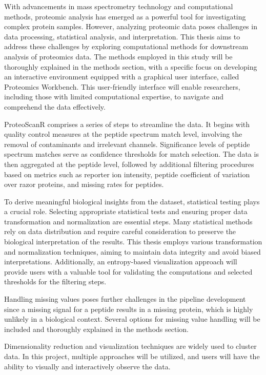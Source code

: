 \documentclass[
  11pt,
]{article}
\begin{document}
With advancements in mass spectrometry technology and computational
methods, proteomic analysis has emerged as a powerful tool for
investigating complex protein samples. However, analyzing proteomic data
poses challenges in data processing, statistical analysis, and
interpretation. This thesis aims to address these challenges by
exploring computational methods for downstream analysis of proteomics
data. The methods employed in this study will be thoroughly explained in
the methods section, with a specific focus on developing an interactive
environment equipped with a graphical user interface, called Proteomics
Workbench. This user-friendly interface will enable researchers,
including those with limited computational expertise, to navigate and
comprehend the data effectively.

ProteoScanR comprises a series of steps to streamline the data. It
begins with quality control measures at the peptide spectrum match
level, involving the removal of contaminants and irrelevant channels.
Significance levels of peptide spectrum matches serve as confidence
thresholds for match selection. The data is then aggregated at the
peptide level, followed by additional filtering procedures based on
metrics such as reporter ion intensity, peptide coefficient of variation
over razor proteins, and missing rates for peptides.

To derive meaningful biological insights from the dataset, statistical
testing plays a crucial role. Selecting appropriate statistical tests
and ensuring proper data transformation and normalization are essential
steps. Many statistical methods rely on data distribution and require
careful consideration to preserve the biological interpretation of the
results. This thesis employs various transformation and normalization
techniques, aiming to maintain data integrity and avoid biased
interpretations. Additionally, an entropy-based visualization approach
will provide users with a valuable tool for validating the computations
and selected thresholds for the filtering steps.

Handling missing values poses further challenges in the pipeline
development since a missing signal for a peptide results in a missing
protein, which is highly unlikely in a biological context. Several
options for missing value handling will be included and thoroughly
explained in the methods section.

Dimensionality reduction and visualization techniques are widely used to
cluster data. In this project, multiple approaches will be utilized, and
users will have the ability to visually and interactively observe the
data.
\end{document}
